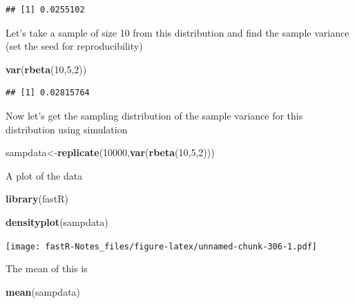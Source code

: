 \documentclass[]{book}
\newenvironment{Shaded}{\begin{snugshade}}{\end{snugshade}}
\newcommand{\KeywordTok}[1]{\textcolor[rgb]{0.13,0.29,0.53}{\textbf{#1}}}
\newcommand{\DecValTok}[1]{\textcolor[rgb]{0.00,0.00,0.81}{#1}}
\newcommand{\NormalTok}[1]{#1}
\theoremstyle{definition}
\theoremstyle{definition}
\theoremstyle{definition}
\theoremstyle{remark}
\begin{document}
\begin{verbatim}
## [1] 0.0255102
\end{verbatim}

Let's take a sample of size 10 from this distribution and find the
sample variance (set the seed for reproducibility)

\begin{Shaded}
\begin{Highlighting}[]
\KeywordTok{var}\NormalTok{(}\KeywordTok{rbeta}\NormalTok{(}\DecValTok{10}\NormalTok{,}\DecValTok{5}\NormalTok{,}\DecValTok{2}\NormalTok{))}
\end{Highlighting}
\end{Shaded}

\begin{verbatim}
## [1] 0.02815764
\end{verbatim}

Now let's get the sampling distribution of the sample variance for this
distribution using simulation

\begin{Shaded}
\begin{Highlighting}[]
\NormalTok{sampdata<-}\KeywordTok{replicate}\NormalTok{(}\DecValTok{10000}\NormalTok{,}\KeywordTok{var}\NormalTok{(}\KeywordTok{rbeta}\NormalTok{(}\DecValTok{10}\NormalTok{,}\DecValTok{5}\NormalTok{,}\DecValTok{2}\NormalTok{)))}
\end{Highlighting}
\end{Shaded}

A plot of the data

\begin{Shaded}
\begin{Highlighting}[]
\KeywordTok{library}\NormalTok{(fastR)}
\end{Highlighting}
\end{Shaded}

\begin{Shaded}
\begin{Highlighting}[]
\KeywordTok{densityplot}\NormalTok{(sampdata)}
\end{Highlighting}
\end{Shaded}

\texttt{[image: fastR-Notes\_files/figure-latex/unnamed-chunk-306-1.pdf]}

The mean of this is

\begin{Shaded}
\begin{Highlighting}[]
\KeywordTok{mean}\NormalTok{(sampdata)}
\end{Highlighting}
\end{Shaded}
\end{document}

